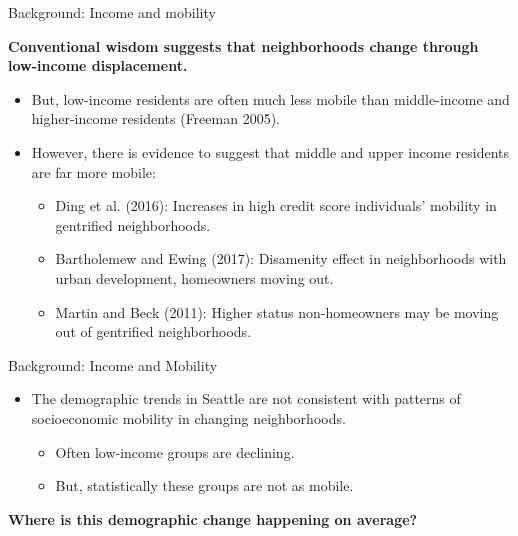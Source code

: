 \documentclass[11pt,ignorenonframetext,]{beamer}
\providecommand{\tightlist}{%
  \setlength{\itemsep}{0pt}\setlength{\parskip}{0pt}}
\begin{document}
\begin{frame}{Background: Income and mobility}
\protect\hypertarget{background-income-and-mobility}{}

\textbf{Conventional wisdom suggests that neighborhoods change through
low-income displacement.}

\begin{itemize}
\tightlist
\item
  But, low-income residents are often much less mobile than
  middle-income and higher-income residents (Freeman 2005).
\item
  However, there is evidence to suggest that middle and upper income
  residents are far more mobile:

  \begin{itemize}
  \tightlist
  \item
    Ding et al. (2016): Increases in high credit score individuals'
    mobility in gentrified neighborhoods.
  \item
    Bartholemew and Ewing (2017): Disamenity effect in neighborhoods
    with urban development, homeowners moving out.
  \item
    Martin and Beck (2011): Higher status non-homeowners may be moving
    out of gentrified neighborhoods.
  \end{itemize}
\end{itemize}

\end{frame}

\begin{frame}{Background: Income and Mobility}
\protect\hypertarget{background-income-and-mobility-1}{}

\begin{itemize}
\tightlist
\item
  The demographic trends in Seattle are not consistent with patterns of
  socioeconomic mobility in changing neighborhoods.

  \begin{itemize}
  \tightlist
  \item
    Often low-income groups are declining.
  \item
    But, statistically these groups are not as mobile.
  \end{itemize}
\end{itemize}

\textbf{Where is this demographic change happening on average?}

\end{frame}
\end{document}
